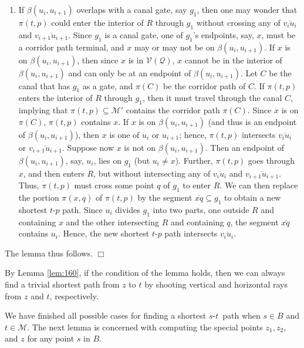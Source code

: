 \documentclass[english,runningheads,11pt]{llncs}
\def\calM{\mathcal{M}}
\def\calQ{\mathcal{Q}}
\def\calV{\mathcal{V}}
\def\st{$s$-$t$}
\newenvironment{proof}{\noindent {\textbf{Proof:}}\rm}{\hfill $\Box$\rm}
\begin{document}
\begin{proof}
\begin{enumerate}
\item
If $\beta(u_i,u_{i+1})$ overlaps with a canal gate, say $g_1$, then one may wonder
that $\pi(t,p)$ could enter the interior of $R$ through $g_1$ without
crossing any of $\overline{v_iu_i}$ and $\overline{v_{i+1}u_{i+1}}$.
Since $g_1$ is a canal gate, one of $g_1$'s endpoints, say, $x$, must be a corridor path
terminal, and $x$ may or may not be on $\beta(u_i,u_{i+1})$.
If $x$ is on $\beta(u_i,u_{i+1})$, then since $x$ is in $\calV(\calQ)$,
$x$ cannot be in the interior of $\beta(u_i,u_{i+1})$ and can only be at an endpoint
of $\beta(u_i,u_{i+1})$. Let $C$ be the canal that has $g_1$ as a
gate, and $\pi(C)$ be the corridor path of $C$. If $\pi(t,p)$
enters the interior of $R$ through $g_1$, then it must travel through the canal $C$,
implying that $\pi(t,p)\subseteq \calM'$ contains the corridor path $\pi(C)$.
Since $x$ is on $\pi(C)$, $\pi(t,p)$ contains $x$.
If $x$ is on $\beta(u_i,u_{i+1})$ (and thus is an endpoint of $\beta(u_i,u_{i+1})$),
then $x$ is one of $u_i$ or $u_{i+1}$; hence, $\pi(t,p)$ intersects $\overline{v_iu_{i}}$ or
$\overline{v_{i+1}u_{i+1}}$.
Suppose now $x$ is not on $\beta(u_i,u_{i+1})$.  Then an endpoint of $\beta(u_i,u_{i+1})$,
say, $u_i$, lies on $g_1$ (but $u_i\not=x$). Further, $\pi(t,p)$ goes through $x$, and then
enters $R$, but without intersecting any of $\overline{v_iu_i}$
and $\overline{v_{i+1}u_{i+1}}$.  Thus, $\pi(t,p)$ must cross some point $q$ of $g_1$
to enter $R$.  We can then replace the portion $\pi(x,q)$ of $\pi(t,p)$ by the segment
$\overline{xq}\subseteq g_1$ to obtain a new shortest $t$-$p$ path.
Since $u_i$ divides $g_1$ into two parts, one outside $R$ and
containing $x$ and the other intersecting $R$ and containing $q$, the segment
$\overline{xq}$ contains $u_i$.  Hence, the new shortest $t$-$p$ path
intersects $\overline{v_iu_{i}}$.


\end{enumerate}

The lemma thus follows.
\end{proof}

By Lemma \ref{lem:160}, if the condition of the lemma
holds, then we can always find a trivial shortest path from $z$ to
$t$ by shooting vertical and horizontal rays from $z$ and $t$, respectively.


We have finished all possible cases for finding a shortest \st\ path
when $s\in B$ and $t\in \calM$.
The next lemma is concerned with computing the special
points $z_1,z_2$, and $z$ for any point $s$ in $B$.
\end{document}
